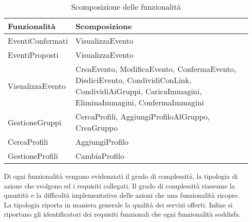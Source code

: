 \begin{table}[htb]
    \centering
    \begin{tabular} {|P{7.3cm}|P{8cm}|}
        \hline
        \textbf{Funzionalità} & \textbf{Scomposizione}                                                                                                                            \\
        \hline
        EventiConfermati      & VisualizzaEvento                                                                                                                                  \\
        \hline
        EventiProposti        & VisualizzaEvento                                                                                                                                  \\
        \hline
        VisualizzaEvento      & CreaEvento, ModificaEvento, ConfermaEvento, DisdiciEvento, CondividiConLink, CondividiAiGruppi, CaricaImmagini, EliminaImmagini, ConfermaImmagini \\
        \hline
        GestioneGruppi        & CercaProfili, AggiungiProfiloAlGruppo, CreaGruppo                                                                                                 \\
        \hline
        CercaProfili          & AggiungiProfilo                                                                                                                                   \\
        \hline
        GestioneProfili       & CambiaProfilo                                                                                                                                     \\
        \hline
    \end{tabular}
    \caption{Scomposizione delle funzionalità}

\end{table}

\clearpage

Di ogni funzionalità vengono evidenziati il grado di complessità, la tipologia di azione che svolgono ed i requisiti collegati.
Il grado di complessità riassume la quantità e la difficoltà implementativa delle azioni che una funzionalità ricopre.
La tipologia riporta in maniera generale la qualità dei servizi offerti.
Infine si riportano gli identificatori dei requisiti funzionali che ogni funzionalità soddisfa.\\

